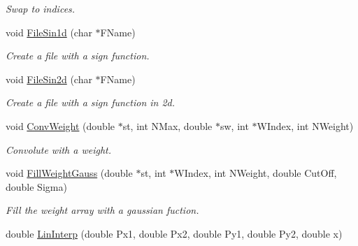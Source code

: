 \begin{DoxyCompactItemize}
\begin{DoxyCompactList}\small\item\em \-Swap to indices. \end{DoxyCompactList}\item 
\hypertarget{classMatematica_a71ea784216a17ac3a6ac15a949cefe0c}{void \hyperlink{classMatematica_a71ea784216a17ac3a6ac15a949cefe0c}{\-File\-Sin1d} (char $\ast$\-F\-Name)}\label{classMatematica_a71ea784216a17ac3a6ac15a949cefe0c}

\begin{DoxyCompactList}\small\item\em \-Create a file with a sign function. \end{DoxyCompactList}\item 
\hypertarget{classMatematica_ab9ebc463654207b4cccb506e91b7f0ee}{void \hyperlink{classMatematica_ab9ebc463654207b4cccb506e91b7f0ee}{\-File\-Sin2d} (char $\ast$\-F\-Name)}\label{classMatematica_ab9ebc463654207b4cccb506e91b7f0ee}

\begin{DoxyCompactList}\small\item\em \-Create a file with a sign function in 2d. \end{DoxyCompactList}\item 
\hypertarget{classMatematica_aeb09a568715afc74c567fe165fe2580d}{void \hyperlink{classMatematica_aeb09a568715afc74c567fe165fe2580d}{\-Conv\-Weight} (double $\ast$st, int \-N\-Max, double $\ast$sw, int $\ast$\-W\-Index, int \-N\-Weight)}\label{classMatematica_aeb09a568715afc74c567fe165fe2580d}

\begin{DoxyCompactList}\small\item\em \-Convolute with a weight. \end{DoxyCompactList}\item 
\hypertarget{classMatematica_a38e3b43d1950bf097523b3b9e5bfb69b}{void \hyperlink{classMatematica_a38e3b43d1950bf097523b3b9e5bfb69b}{\-Fill\-Weight\-Gauss} (double $\ast$st, int $\ast$\-W\-Index, int \-N\-Weight, double \-Cut\-Off, double \-Sigma)}\label{classMatematica_a38e3b43d1950bf097523b3b9e5bfb69b}

\begin{DoxyCompactList}\small\item\em \-Fill the weight array with a gaussian fuction. \end{DoxyCompactList}\item 
\hypertarget{classMatematica_aa0b83812f24967b127cbd0b508d8ed95}{double \hyperlink{classMatematica_aa0b83812f24967b127cbd0b508d8ed95}{\-Lin\-Interp} (double \-Px1, double \-Px2, double \-Py1, double \-Py2, double x)}\label{classMatematica_aa0b83812f24967b127cbd0b508d8ed95}


\end{DoxyCompactItemize}
